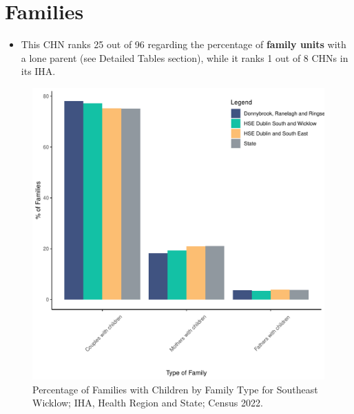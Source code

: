 \documentclass{article}
\begin{document}
\section{Families}\label{sect:Fam}
\begin{itemize}
\item This CHN ranks  25 out of 96 regarding the percentage of \textbf{family units} with a lone parent (see Detailed Tables section), while it ranks   1 out of 8 CHNs in its IHA.
\end{itemize}
\begin{figure}[H]
	\centering
	\includegraphics[width = 150mm]{../figures/FamED.pdf}
	\caption{Percentage of Families with Children by Family Type for Southeast Wicklow; IHA, Health Region and State; Census 2022.}
	\label{fig:vbnv}
	\end{figure}
	
\end{document}
